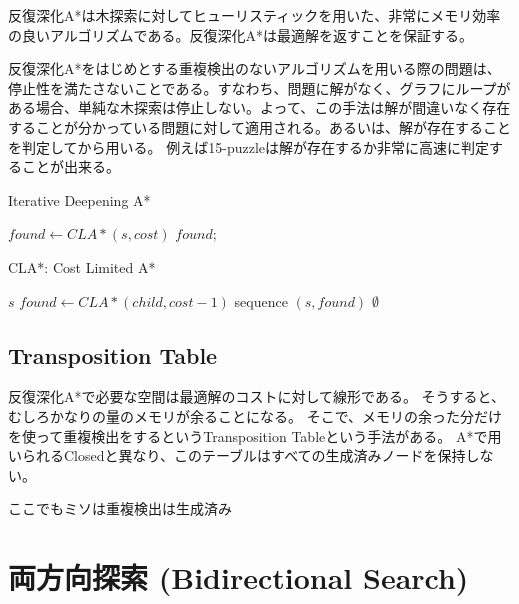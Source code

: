 \documentclass{report}
\begin{document}
反復深化A*は木探索に対してヒューリスティックを用いた、非常にメモリ効率の良いアルゴリズムである。反復深化A*は最適解を返すことを保証する。


反復深化A*をはじめとする重複検出のないアルゴリズムを用いる際の問題は、停止性を満たさないことである。すなわち、問題に解がなく、グラフにループがある場合、単純な木探索は停止しない。よって、この手法は解が間違いなく存在することが分かっている問題に対して適用される。あるいは、解が存在することを判定してから用いる。
例えば15-puzzleは解が存在するか非常に高速に判定することが出来る。



\begin{algorithm}
\caption{Iterative Deepening A*}
\label{alg:iterative-deepening-astar}
	 {
		$found \leftarrow CLA*(s, cost)$\;
		 {
			\Return $found$;
		}
	}
\end{algorithm}

\begin{algorithm}
\caption{CLA*: Cost Limited A*}
\label{alg:implicit-graph-search}
	 {
		\Return $s$\;
	}
	 {
		$found \leftarrow CLA*(child, cost - 1)$\;
		 {
			\Return sequence $(s, found)$\;
		}
	}
	\Return $\emptyset$\;
\end{algorithm}

\subsection{Transposition Table}

反復深化A*で必要な空間は最適解のコストに対して線形である。
そうすると、むしろかなりの量のメモリが余ることになる。
そこで、メモリの余った分だけを使って重複検出をするというTransposition Tableという手法がある。
A*で用いられるClosedと異なり、このテーブルはすべての生成済みノードを保持しない。

ここでもミソは重複検出は生成済み

\section{両方向探索 (Bidirectional Search)}
\label{sec:bidirectional-search}
\end{document}
